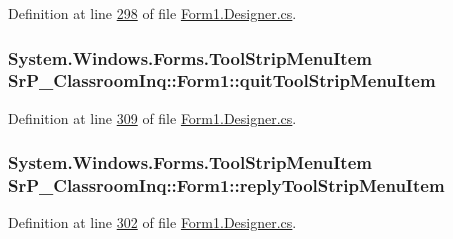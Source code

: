\-Definition at line \hyperlink{_form1_8_designer_8cs_source_l00298}{298} of file \hyperlink{_form1_8_designer_8cs_source}{\-Form1.\-Designer.\-cs}.

\hypertarget{class_sr_p___classroom_inq_1_1_form1_a21aff2285e9e1a058884bcb1b016b7f5}{
\subsubsection[{quit\-Tool\-Strip\-Menu\-Item}]{\setlength{\rightskip}{0pt plus 5cm}\-System.\-Windows.\-Forms.\-Tool\-Strip\-Menu\-Item {\bf \-Sr\-P\-\_\-\-Classroom\-Inq\-::\-Form1\-::quit\-Tool\-Strip\-Menu\-Item}}}
\label{class_sr_p___classroom_inq_1_1_form1_a21aff2285e9e1a058884bcb1b016b7f5}


\-Definition at line \hyperlink{_form1_8_designer_8cs_source_l00309}{309} of file \hyperlink{_form1_8_designer_8cs_source}{\-Form1.\-Designer.\-cs}.

\hypertarget{class_sr_p___classroom_inq_1_1_form1_acc6ff110ce8c8a1171c0a1d30ca10a9c}{
\subsubsection[{reply\-Tool\-Strip\-Menu\-Item}]{\setlength{\rightskip}{0pt plus 5cm}\-System.\-Windows.\-Forms.\-Tool\-Strip\-Menu\-Item {\bf \-Sr\-P\-\_\-\-Classroom\-Inq\-::\-Form1\-::reply\-Tool\-Strip\-Menu\-Item}}}
\label{class_sr_p___classroom_inq_1_1_form1_acc6ff110ce8c8a1171c0a1d30ca10a9c}


\-Definition at line \hyperlink{_form1_8_designer_8cs_source_l00302}{302} of file \hyperlink{_form1_8_designer_8cs_source}{\-Form1.\-Designer.\-cs}.

